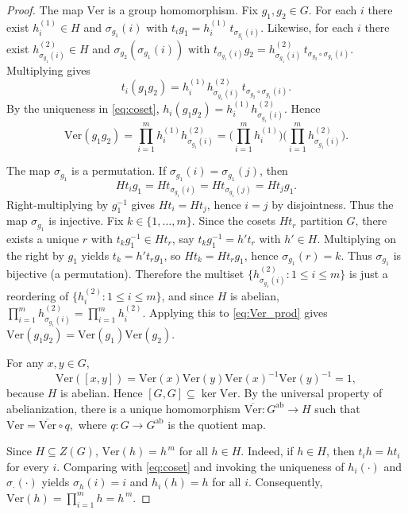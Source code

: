 \documentclass[12pt,oneside,a4paper]{article}
\theoremstyle{mytheorem}
\theoremstyle{remark}
\theoremstyle{definition}
\begin{document}
\begin{proof}
The map $\mathrm{Ver}$ is a group homomorphism.  Fix $g_1,g_2\in G$. For
each $i$ there exist $h_i^{(1)}\in H$ and $\sigma_{g_1}(i)$ with
$t_i g_1 = h_i^{(1)}\, t_{\sigma_{g_1}(i)}.$ Likewise, for each $i$ there
exist $h_{\sigma_{g_1}(i)}^{(2)}\in H$ and
$\sigma_{g_2}(\sigma_{g_1}(i))$ with
$t_{\sigma_{g_1}(i)} g_2 = h_{\sigma_{g_1}(i)}^{(2)}\,
t_{\sigma_{g_2}\circ\sigma_{g_1}(i)}.$ Multiplying gives
\[
t_i(g_1g_2)=h_i^{(1)}h_{\sigma_{g_1}(i)}^{(2)}\, t_{\sigma_{g_2}\circ\sigma_{g_1}(i)}.
\]
By the uniqueness in \eqref{eq:coset}, $h_i(g_1g_2)=h_i^{(1)}h_{\sigma_{g_1}(i)}^{(2)}$. Hence
\begin{equation}\label{eq:Ver_prod}
\mathrm{Ver}(g_1g_2)
=\prod_{i=1}^m h_i^{(1)}h_{\sigma_{g_1}(i)}^{(2)}
=\Big(\prod_{i=1}^m h_i^{(1)}\Big)\Big(\prod_{i=1}^m h_{\sigma_{g_1}(i)}^{(2)}\Big).
\end{equation}

The map $\sigma_{g_1}$ is a permutation.  If $\sigma_{g_1}(i)=\sigma_{g_1}(j)$, then
\[
Ht_i g_1 = H t_{\sigma_{g_1}(i)} = H t_{\sigma_{g_1}(j)} = H t_j g_1.
\]
Right-multiplying by $g_1^{-1}$ gives $Ht_i=Ht_j$, hence $i=j$ by disjointness.  Thus the map $\sigma_{g_1}$ is injective.  Fix $k\in\{1,\dots,m\}$. Since the cosets $Ht_r$ partition $G$, there exists a unique $r$ with $t_k g_1^{-1}\in Ht_r$, say $t_k g_1^{-1}=h' t_r$ with $h'\in H$. Multiplying on the right by $g_1$ yields $t_k=h' t_r g_1$, so $Ht_k=Ht_r g_1$, hence $\sigma_{g_1}(r)=k$.  
Thus $\sigma_{g_1}$ is bijective (a permutation). Therefore the multiset $\{h_{\sigma_{g_1}(i)}^{(2)}:1\le i\le m\}$ is just a reordering of $\{h_i^{(2)}:1\le i\le m\}$, and since $H$ is abelian,
$\prod_{i=1}^m h_{\sigma_{g_1}(i)}^{(2)}=\prod_{i=1}^m h_i^{(2)}.$ Applying this to \eqref{eq:Ver_prod} gives
$\mathrm{Ver}(g_1g_2)=\mathrm{Ver}(g_1)\mathrm{Ver}(g_2)$.


For any $x,y\in G$,
\[
\mathrm{Ver}([x,y])=\mathrm{Ver}(x)\mathrm{Ver}(y)\mathrm{Ver}(x)^{-1}\mathrm{Ver}(y)^{-1}=1,
\]
because $H$ is abelian. Hence $[G,G]\subseteq\ker\mathrm{Ver}$. By the universal property of abelianization, there is a unique homomorphism
$\overline{\mathrm{Ver}}:G^{\mathrm{ab}}\to H$ such that $ \mathrm{Ver}=\overline{\mathrm{Ver}}\circ q,$ where $q:G\to G^{\mathrm{ab}}$ is the quotient map. 



Since $H\subseteq Z(G)$,  $\mathrm{Ver}(h)=h^{\,m}$ for all $h\in H$. Indeed, if $h\in H$, then $t_i h = h t_i$ for every $i$. Comparing with \eqref{eq:coset} and invoking the uniqueness of $h_i(\cdot)$ and $\sigma_{\cdot}(\cdot)$ yields $\sigma_h(i)=i$ and $h_i(h)=h$ for all $i$. Consequently,
$\mathrm{Ver}(h)=\prod_{i=1}^m h = h^{\,m}.$


\end{proof}
\end{document}
